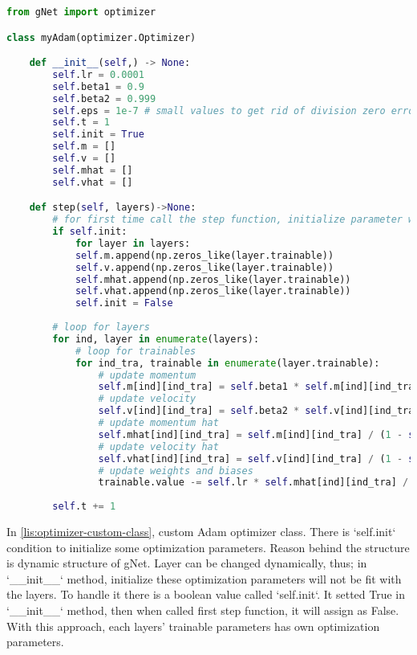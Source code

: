 \documentclass[12pt]{report}
\begin{document}
\begin{lstlisting}[language=Python, numbers=none, caption={Custom optimizer class.}, label={lis:optimizer-custom-class}]
from gNet import optimizer

class myAdam(optimizer.Optimizer)

    def __init__(self,) -> None:
		self.lr = 0.0001
		self.beta1 = 0.9
		self.beta2 = 0.999
		self.eps = 1e-7 # small values to get rid of division zero error.
		self.t = 1
		self.init = True
		self.m = []
		self.v = []
		self.mhat = []
		self.vhat = []

	def step(self, layers)->None:
		# for first time call the step function, initialize parameter w.r.t layer size and trainable variable size.
		if self.init:
			for layer in layers:
			self.m.append(np.zeros_like(layer.trainable))
			self.v.append(np.zeros_like(layer.trainable))
			self.mhat.append(np.zeros_like(layer.trainable))
			self.vhat.append(np.zeros_like(layer.trainable))
			self.init = False
		
		# loop for layers
		for ind, layer in enumerate(layers):
			# loop for trainables
			for ind_tra, trainable in enumerate(layer.trainable):    
				# update momentum
				self.m[ind][ind_tra] = self.beta1 * self.m[ind][ind_tra] + (1 - self.beta1) * trainable.grad.value
				# update velocity
				self.v[ind][ind_tra] = self.beta2 * self.v[ind][ind_tra] + (1 - self.beta2) * (trainable.grad.value ** 2)
				# update momentum hat
				self.mhat[ind][ind_tra] = self.m[ind][ind_tra] / (1 - self.beta1 ** self.t)
				# update velocity hat
				self.vhat[ind][ind_tra] = self.v[ind][ind_tra] / (1 - self.beta2 ** self.t)
				# update weights and biases
				trainable.value -= self.lr * self.mhat[ind][ind_tra] / (np.sqrt(self.vhat[ind][ind_tra]) + self.eps)
				
		self.t += 1

\end{lstlisting}

In \ref{lis:optimizer-custom-class}, custom Adam optimizer class. There is `self.init` condition to initialize some optimization parameters. Reason behind the structure is dynamic structure of gNet. Layer can be changed dynamically, thus; in `\_\_init\_\_` method, initialize these optimization parameters will not be fit with the layers. To handle it there is a boolean value called `self.init`. It setted True in `\_\_init\_\_` method, then when called first step function, it will assign as False. With this approach, each layers' trainable parameters has own optimization parameters. 
\end{document}
